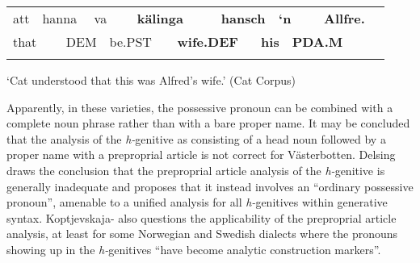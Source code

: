\begin{tabular}{llllllllllllll}
\lsptoprule
att & \multicolumn{2}{l}{hanna

} & \multicolumn{2}{l}{va

} & \multicolumn{2}{l}{{\bfseries kälinga}

} & \multicolumn{2}{l}{{\bfseries hansch}

} & \multicolumn{2}{l}{{\bfseries ‘n}

} & \multicolumn{2}{l}{{\bfseries Allfre.}

} & \\
\multicolumn{2}{l}{that

} & \multicolumn{2}{l}{DEM

} & \multicolumn{2}{l}{be.PST

} & \multicolumn{2}{l}{{\bfseries wife.DEF}

} & \multicolumn{2}{l}{{\bfseries his}

} & \multicolumn{2}{l}{{\bfseries PDA.M}

} & \multicolumn{2}{l}{}\\
\lspbottomrule
\end{tabular}

\begin{styleTranslation}
‘Cat understood that this was Alfred’s wife.’ (Cat Corpus)

\end{styleTranslation}

\begin{styleBodyTextFirst}
Apparently, in these varieties, the possessive pronoun can be combined with a complete noun phrase rather than with a bare proper name. It may be concluded that the analysis of the \textit{h-}genitive as consisting of a head noun followed by a proper name with a preproprial article is not correct for Västerbotten.  Delsing draws the conclusion that the preproprial article analysis of the \textit{h-}genitive is generally inadequate and proposes that it instead involves an “ordinary possessive pronoun”, amenable to a unified analysis for all \textit{h-}genitives within generative syntax. Koptjevskaja-\citet{Tamm2003} also questions the applicability of the preproprial article analysis, at least for some Norwegian and Swedish dialects where the pronouns showing up in the \textit{h-}genitives “have become analytic construction markers”. 

\end{styleBodyTextFirst}

